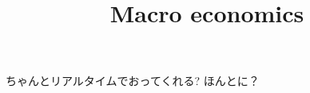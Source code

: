\documentclass[a4paper, 12pt, dvipdfmx]{jarticle}
\begin{document}
\title{Macro economics}
\author{}
\date{}
\maketitle
ちゃんとリアルタイムでおってくれる?
ほんとに？

\begin{comment}
\begin{figure}[H]
\centering
\texttt{[image: frog.jpg]}
\caption{\label{fig:frog}This frog was uploaded via the file-tree menu.}
\end{figure}


\href{https://www.overleaf.com/learn/latex/tables}{tables}.

\begin{table}[H]
\centering
\begin{tabular}{l|r}
Item & Quantity \\\hline
Widgets & 42 \\
Gadgets & 13
\end{tabular}
\caption{\label{tab:widgets}An example table.}
\end{table}
\end{comment}


   \nocite{*}
   
\end{document}
